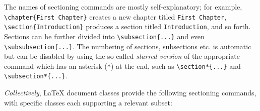 The names of sectioning commands are mostly self-explanatory; for example,\\ \verb|\chapter{First Chapter}| creates a new chapter titled \verb|First Chapter|,\\\verb|\section{Introduction}| produces a section titled \verb|Introduction|, and so forth. Sections can be further divided into \verb|\subsection{...}| and even \verb|\subsubsection{...}|. The numbering of sections, subsections etc. is automatic but can be disabled by using the so-called \emph{starred version} of the appropriate command which has an asterisk (\verb|*|) at the end, such as \verb|\section*{...}| and \verb|\subsection*{...}|.

\emph{Collectively}, LaTeX document classes provide the following sectioning commands, with specific classes each supporting a relevant subset:

